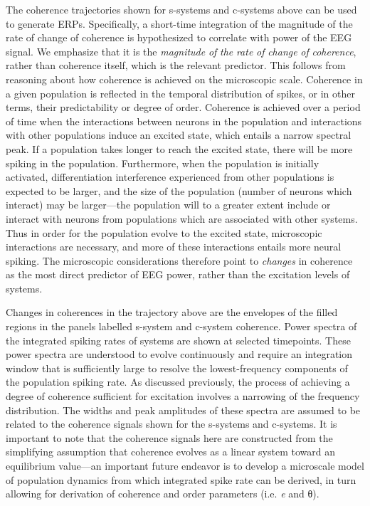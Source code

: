   The coherence trajectories shown for s-systems and c-systems above can be used to generate ERPs. Specifically, a short-time integration of the magnitude of the rate of change of coherence is hypothesized to correlate with power of the EEG signal. We emphasize that it is the \textit{magnitude} \textit{of} \textit{the} \textit{rate} \textit{of} \textit{change} \textit{of} \textit{coherence}, rather than coherence itself, which is the relevant predictor. This follows from reasoning about how coherence is achieved on the microscopic scale. Coherence in a given population is reflected in the temporal distribution of spikes, or in other terms, their predictability or degree of order. Coherence is achieved over a period of time when the interactions between neurons in the population and interactions with other populations induce an excited state, which entails a narrow spectral peak. If a population takes longer to reach the excited state, there will be more spiking in the population. Furthermore, when the population is initially activated, differentiation interference experienced from other populations is expected to be larger, and the size of the population (number of neurons which interact) may be larger—the population will to a greater extent include or interact with neurons from populations which are associated with other systems. Thus in order for the population evolve to the excited state, microscopic interactions are necessary, and more of these interactions entails more neural spiking. The microscopic considerations therefore point to \textit{changes} in coherence as the most direct predictor of EEG power, rather than the excitation levels of systems. 

Changes in coherences in the trajectory above are the envelopes of the filled regions in the panels labelled s-system and c-system coherence. Power spectra of the integrated spiking rates of systems are shown at selected timepoints. These power spectra are understood to evolve continuously and require an integration window that is sufficiently large to resolve the lowest-frequency components of the population spiking rate. As discussed previously, the process of achieving a degree of coherence sufficient for excitation involves a narrowing of the frequency distribution. The widths and peak amplitudes of these spectra are assumed to be related to the coherence signals shown for the s-systems and c-systems. It is important to note that the coherence signals here are constructed from the simplifying assumption that coherence evolves as a linear system toward an equilibrium value—an important future endeavor is to develop a microscale model of population dynamics from which integrated spike rate can be derived, in turn allowing for derivation of coherence and order parameters (i.e. \textit{e} and θ). 

